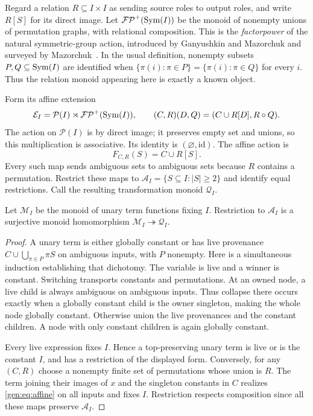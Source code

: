 Regard a relation $R\subseteq I\times I$ as sending source roles to
output roles, and write $R[S]$ for its direct image. Let $\mathcal{FP}^{+}(\operatorname{Sym}(I))$
be the monoid of nonempty unions of permutation graphs, with relational
composition. This is the \emph{factorpower} of the natural symmetric-group
action, introduced by Ganyushkin and Mazorchuk and surveyed by
Mazorchuk~\cite{GanyushkinMazorchuk1995,Mazorchuk2009}. In the usual
definition, nonempty subsets $P,Q\subseteq\operatorname{Sym}(I)$ are identified when
$\{\pi(i):\pi\in P\}=\{\pi(i):\pi\in Q\}$ for every $i$.
Thus the relation monoid appearing here is exactly a known object.

Form its affine extension
\[
 \mathcal E_I=\mathcal P(I)\rtimes\mathcal{FP}^{+}(\operatorname{Sym}(I)),\qquad
 (C,R)(D,Q)=(C\cup R[D],R\circ Q).
\]
The action on $\mathcal P(I)$ is by direct image; it preserves empty set
and unions, so this multiplication is associative. Its identity is
$(\varnothing,\mathrm{id})$. The affine action is
\begin{equation}\label{gen:eq:affine}
 F_{C,R}(S)=C\cup R[S].
\end{equation}
Every such map sends ambiguous sets to ambiguous sets because $R$
contains a permutation. Restrict these maps to
$\mathcal A_I=\{S\subseteq I:|S|\geq2\}$ and identify equal restrictions.
Call the resulting transformation monoid $\mathcal Q_I$.

\begin{proposition}\label{gen:thm:quotient}
Let $\mathcal M_I$ be the monoid of unary term functions fixing $I$.
Restriction to $\mathcal A_I$ is a surjective monoid homomorphism
$\mathcal M_I\twoheadrightarrow\mathcal Q_I$.
\end{proposition}
\begin{proof}
A unary term is either globally constant or has live provenance
$C\cup\bigcup_{\pi\in P}\pi S$ on ambiguous inputs, with $P$ nonempty.
Here is a simultaneous induction establishing that dichotomy. The
variable is live and a winner is constant. Switching transports constants
and permutations. At an owned node, a live child is always ambiguous on
ambiguous inputs. Thus collapse there occurs exactly when a globally
constant child is the owner singleton, making the whole node globally
constant. Otherwise union the live provenances and the constant children.
A node with only constant children is again globally constant.

Every live expression fixes $I$. Hence a top-preserving unary term is
live or is the constant $I$, and has a restriction of the displayed form.
Conversely, for any $(C,R)$ choose a nonempty finite set of permutations
whose union is $R$. The term joining their images of $x$ and the
singleton constants in $C$ realizes \eqref{gen:eq:affine} on all inputs and
fixes $I$. Restriction respects composition since all these maps preserve
$\mathcal A_I$.
\end{proof}

